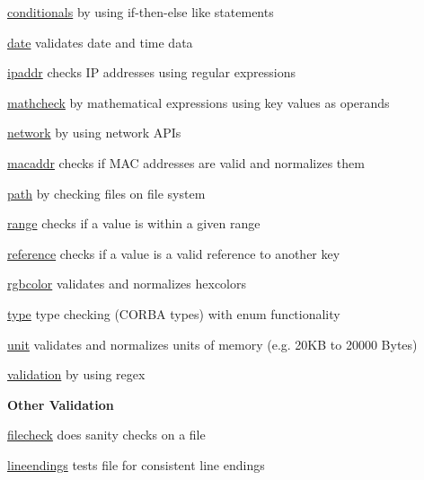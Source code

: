 \begin{DoxyItemize}
\item \mbox{\hyperlink{autotoc_md88_src_plugins_conditionals_README_md}{conditionals}} by using if-\/then-\/else like statements
\item \mbox{\hyperlink{autotoc_md158_src_plugins_date_README_md}{date}} validates date and time data
\item \mbox{\hyperlink{autotoc_md323_src_plugins_ipaddr_README_md}{ipaddr}} checks IP addresses using regular expressions
\item \mbox{\hyperlink{autotoc_md399_src_plugins_mathcheck_README_md}{mathcheck}} by mathematical expressions using key values as operands
\item \mbox{\hyperlink{autotoc_md484_src_plugins_network_README_md}{network}} by using network A\+P\+Is
\item \mbox{\hyperlink{autotoc_md395_src_plugins_macaddr_README_md}{macaddr}} checks if M\+AC addresses are valid and normalizes them
\item \mbox{\hyperlink{autotoc_md520_src_plugins_path_README_md}{path}} by checking files on file system
\item \mbox{\hyperlink{autotoc_md571_src_plugins_range_README_md}{range}} checks if a value is within a given range
\item \mbox{\hyperlink{autotoc_md596_src_plugins_reference_README_md}{reference}} checks if a value is a valid reference to another key
\item \mbox{\hyperlink{autotoc_md628_src_plugins_rgbcolor_README_md}{rgbcolor}} validates and normalizes hexcolors
\item \mbox{\hyperlink{autotoc_md695_src_plugins_type_README_md}{type}} type checking (C\+O\+R\+BA types) with enum functionality
\item \mbox{\hyperlink{autotoc_md706_src_plugins_unit_README_md}{unit}} validates and normalizes units of memory (e.\+g. 20KB to 20000 Bytes)
\item \mbox{\hyperlink{autotoc_md710_src_plugins_validation_README_md}{validation}} by using regex
\end{DoxyItemize}

{\bfseries{Other Validation}}


\begin{DoxyItemize}
\item \mbox{\hyperlink{autotoc_md233_src_plugins_filecheck_README_md}{filecheck}} does sanity checks on a file
\item \mbox{\hyperlink{autotoc_md382_src_plugins_lineendings_README_md}{lineendings}} tests file for consistent line endings
\end{DoxyItemize}

